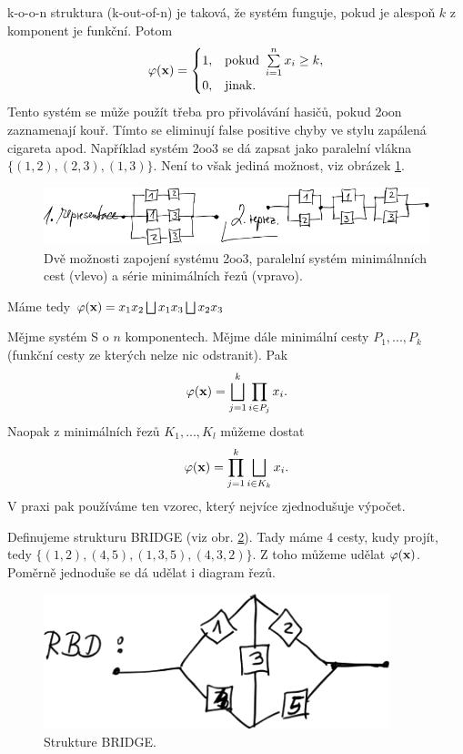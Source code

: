     \begin{define}[k-o-o-n struktura]
        k-o-o-n struktura (k-out-of-n) je taková, že systém funguje, pokud je alespoň $k$ z komponent je funkční. Potom
        $$ \crossedphi(\textbf{x})=\begin{cases}
        1,&\text{pokud }\sumin x_i\geq k,\\0,& \text{jinak.}
        \end{cases}$$
        Tento systém se může použít třeba pro přivolávání hasičů, pokud 2oon zaznamenají kouř. Tímto se eliminují false positive chyby ve stylu zapálená cigareta apod. Například systém 2oo3 se dá zapsat jako paralelní vlákna $\{(1,2), (2,3),(1,3)\}$. Není to však jediná možnost, viz obrázek \ref{fig:2oo3}.
        
        \begin{figure}[h]
            \centering
            \includegraphics[width=0.7\linewidth]{pictures/2oo3}
            \caption{Dvě možnosti zapojení systému 2oo3, paralelní systém minimálnních cest (vlevo) a série minimálních řezů (vpravo).}
            \label{fig:2oo3}
        \end{figure}
        
        Máme tedy $\crossedphi(\textbf{x})=x_1x_2\bigsqcup x_1x_3\bigsqcup x_2x_3$
    \end{define}

    \begin{theorem}
        Mějme systém S o $n$ komponentech. Mějme dále minimální cesty $P_1,...,P_k$ (funkční cesty ze kterých nelze nic odstranit). Pak $$ \crossedphi(\textbf{x})=\bigsqcup_{j=1}^k \prod_{i\in P_j} x_i.$$
        Naopak z minimálních řezů $K_1,...,K_l$ můžeme dostat
        $$ \crossedphi(\textbf{x})= \prod_{j=1}^k \bigsqcup_{i\in K_k} x_i.$$
        V praxi pak používáme ten vzorec, který nejvíce zjednodušuje výpočet.
    \end{theorem}

    \begin{corollary}
        Definujeme strukturu BRIDGE (viz obr. \ref{fig:bridge}). Tady máme 4 cesty, kudy projít, tedy $\{(1,2),(4,5),(1,3,5),(4,3,2)\}$. Z toho můžeme udělat $\crossedphi(\textbf{x})$. Poměrně jednoduše se dá udělat i diagram řezů.
        
        \begin{figure}[h]
            \centering
            \includegraphics[width=0.3\linewidth]{pictures/bridge}
            \caption{Strukture BRIDGE.}
            \label{fig:bridge}
        \end{figure}
        
    \end{corollary}

